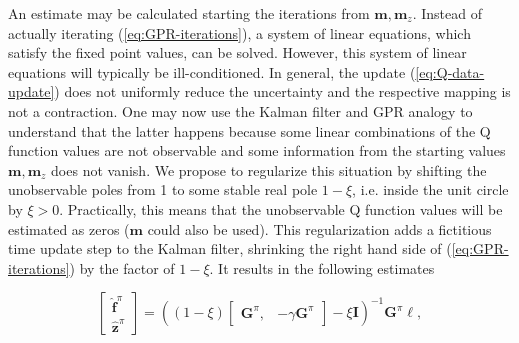 \documentclass{ifacconf}
\begin{document}
\noindent An estimate may be calculated starting the iterations from
$\mathbf{m},\mathbf{m}_{z}$. Instead of actually iterating (\ref{eq:GPR-iterations}),
a system of linear equations, which satisfy the fixed point values,
can be solved. However, this system of linear equations will typically
be ill-conditioned. In general, the update (\ref{eq:Q-data-update})
does not uniformly reduce the uncertainty and the respective mapping
is not a contraction. One may now use the Kalman filter and GPR analogy
to understand that the latter happens because some linear combinations
of the Q function values are not observable \citep{ecc19ref:Kwakernaak_linear_optimal_control_systems}
and some information from the starting values $\mathbf{m},\mathbf{m}_{z}$
does not vanish. We propose to regularize this situation by shifting
the unobservable poles from 1 to some stable real pole $1-\xi$, i.e.
inside the unit circle by $\xi>0$. Practically, this means that
the unobservable Q function values will be estimated as zeros ($\mathbf{m}$
could also be used). This regularization adds a fictitious time update
step to the Kalman filter, shrinking the right hand side of (\ref{eq:GPR-iterations})
by the factor of $1-\xi$. It results in the following estimates

\begin{equation}
\left[\begin{array}{c}
\hat{\mathbf{f}}^{\pi}\\
\mathbf{\hat{z}}^{\pi}
\end{array}\right]=\left(\left(1-\xi\right)\left[\begin{array}{cc}
\mathbf{G}^{\pi}, & -\gamma\mathbf{G}^{\pi}\end{array}\right]-\xi\mathbf{I}\right)^{-1}\mathbf{G}^{\pi}\boldsymbol{\ell},\label{eq:Q-unbiased-estimate-regularized}
\end{equation}
 
\end{document}
